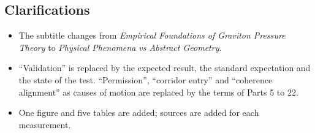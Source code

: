 \documentclass[11pt,a4paper]{article}
\begin{document}
\subsection*{Clarifications}
\begin{itemize}
\item The subtitle changes from \emph{Empirical Foundations of Graviton Pressure Theory} to \emph{Physical Phenomena vs Abstract Geometry}.
\item ``Validation'' is replaced by the expected result, the standard expectation and the state of the test. ``Permission'', ``corridor entry'' and ``coherence alignment'' as causes of motion are replaced by the terms of Parts 5 to 22.
\item One figure and five tables are added; sources are added for each measurement.
\end{itemize}


\end{document}
